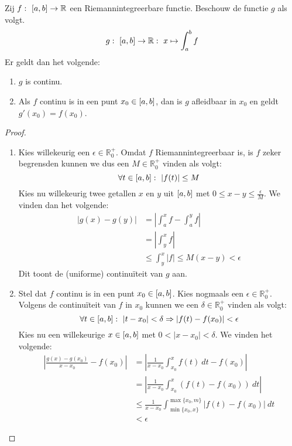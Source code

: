 \documentclass[main.tex]{subfiles}
\begin{document}
\begin{bst}
  Zij $f:\ \interval{a}{b} \rightarrow \mathbb{R}$ een Riemannintegreerbare functie.
  Beschouw de functie $g$ als volgt.
  \[ g:\ \interval{a}{b} \rightarrow \mathbb{R}:\ x \mapsto \int_{a}^{b}f \]
  Er geldt dan het volgende:
  \begin{enumerate}
  \item $g$ is continu.
  \item Als $f$ continu is in een punt $x_{0}\in \interval{a}{b}$, dan is $g$ afleidbaar in $x_{0}$ en geldt $g'(x_{0}) = f(x_{0})$.
  \end{enumerate}

  \begin{proof}
    \noindent
    \begin{enumerate}
    \item 
      Kies willekeurig een $\epsilon\in\mathbb{R}_{0}^{+}$.
      Omdat $f$ Riemannintegreerbaar is, is $f$ zeker begrensd\needed en kunnen we dus een $M\in\mathbb{R}_{0}^{+}$ vinden als volgt:
      \[ \forall t\in\interval{a}{b}:\ |f(t)| \le M \]
      Kies nu willekeurig twee getallen $x$ en $y$ uit $\interval{a}{b}$ met $0 \le x-y \le \frac{\epsilon}{M}$.
      We vinden dan het volgende:
      \begin{align*}
        |g(x)-g(y)|
        &= \left|\int_{a}^{x}f-\int_{a}^{y}f\right|\\
        &= \left| \int_{y}^{x}f\right|\\
        &\le \int_{y}^{x}|f| \le M(x-y) < \epsilon
      \end{align*}
      Dit toont de (uniforme) continu\"iteit van $g$ aan.
      
    \item 
      Stel dat $f$ continu is in een punt $x_{0}\in\interval{a}{b}$.
      Kies nogmaals een $\epsilon\in\mathbb{R}_{0}^{+}$.
      Volgens de continu\"iteit van $f$ in $x_{0}$ kunnen we een $\delta\in\mathbb{R}_{0}^{+}$ vinden als volgt:
      \[ \forall t\in\interval{a}{b}:\ |t-x_{0}| < \delta \Rightarrow |f(t)-f(x_{0})| < \epsilon \]
      Kies nu een willekeurige $x\in\interval{a}{b}$ met $0 < |x-x_{0}| < \delta$.
      We vinden het volgende:
      \begin{align*}
        \left| \frac{g(x)-g(x_{0})}{x-x_{0}} - f(x_{0}) \right|
        &= \left| \frac{1}{x-x_{0}} \int_{x_{0}}^{x}f(t)\ dt - f(x_{0}) \right|\\
        &= \left| \frac{1}{x-x_{0}} \int_{x_{0}}^{x}(f(t)-f(x_{0}))\ dt \right|\\
        &\le \frac{1}{x-x_{0}} \int_{\min\{x_{0},x\}}^{\max\{x_{0},m\}}|f(t)-f(x_{0})|\ dt\\
        &< \epsilon
      \end{align*}
    \end{enumerate} 
  \end{proof}
\end{bst}
\end{document}
